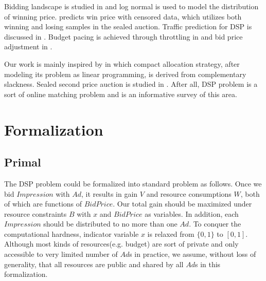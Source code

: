 \documentclass{article}
\begin{document}

Bidding landscape is studied in \cite{YingCui2011} and log normal is used to model the distribution of winning price.
\cite{Wu2015} predicts win price with censored data, which utilizes both winning and losing samples in the sealed auction.
Traffic prediction for DSP is discussed in \cite{Traffic2016}.
Budget pacing is achieved through throttling in \cite{Throttle2015} and bid price adjustment in \cite{Pacing2013}.

Our work is mainly inspired by \cite{YeChen2011} in which compact allocation strategy,
    after modeling its problem as linear programming, is derived from complementary slackness.
Sealed second price auction is studied in \cite{SSPA1961}.
After all, DSP problem is a sort of online matching problem and \cite{Mehta} is an informative survey of this area.

\section{Formalization} \label{Formalization}

\subsection{Primal} \label{Primal}

The DSP problem could be formalized into standard problem as follows.
Once we bid $Impression$ with $Ad$, it results in gain $V$ and resource consumptions $W$, both of which are functions of $BidPrice$.
Our total gain should be maximized under resource constraints $B$ with $x$ and $BidPrice$ as variables.
In addition, each $Impression$ should be distributed to no more than one $Ad$.
To conquer the computational hardness, indicator variable $x$ is relaxed from $\{0, 1\}$ to $[0, 1]$.
Although most kinds of resources(e.g. budget) are sort of private and only accessible to very limited number of $Ad$s in practice,
    we assume, without loss of generality, that all resources are public and shared by all $Ad$s in this formalization.
\end{document}
